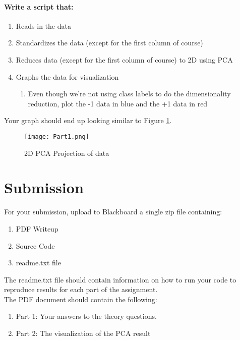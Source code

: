 \documentclass[12pt]{article}
\begin{document}
\paragraph{Write a script that:}
\begin{enumerate}
  \item Reads in the data
  \item Standardizes the data (except for the first column of course)
  \item Reduces data (except for the first column of course) to 2D using PCA
  \item Graphs the data for visualization
      \begin{enumerate}
        \item   Even though we're not using class labels to do the dimensionality reduction, plot the -1 data in blue and the +1 data in red
      \end{enumerate}
\end{enumerate}


Your graph should end up looking similar to Figure \ref{PCA}.
\begin{figure}[H]
\begin{center}
\texttt{[image: Part1.png]}
\caption{2D PCA Projection of data}
\label{PCA}
\end{center}
\end{figure}


\newpage
\section*{Submission}
For your submission, upload to Blackboard a single zip file containing:

\begin{enumerate}
\item PDF Writeup
\item Source Code
\item readme.txt file
\end{enumerate}

\noindent
The readme.txt file should contain information on how to run your code to reproduce results for each part of the assignment.\\

\noindent
The PDF document should contain the following:
\begin{enumerate}
\item Part 1: Your answers to the theory questions.
\item Part 2: The visualization of the PCA result
\end{enumerate}
\end{document}
